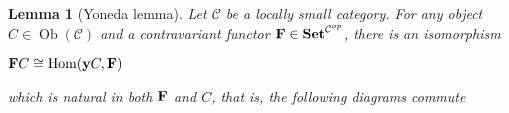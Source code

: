 \documentclass[a4paper]{article}
\theoremstyle{defin}
\theoremstyle{theorem}
\theoremstyle{claim}
\theoremstyle{prop}
\theoremstyle{lemma}
\newtheorem{lemma}{Lemma}
\theoremstyle{fact}
\theoremstyle{ex}
\theoremstyle{col}
\begin{document}
\begin{lemma} [Yoneda lemma]

Let $\mathcal{C}$ be a locally small category. For any object $C \in \operatorname{Ob}(\mathcal{C})$ and a contravariant functor ${\bf F} \in {\bf Set}^{\mathcal{C}^{op}}$, there is an isomorphism

\begin{center}
${\bf F} C \cong \operatorname{Hom}({\bf y}C, {\bf F})$
\end{center}
which is natural in both ${\bf F}$ and $C$, that is, the following diagrams commute

\centerline{
}
\centerline{
}
\end{lemma}
\end{document}
